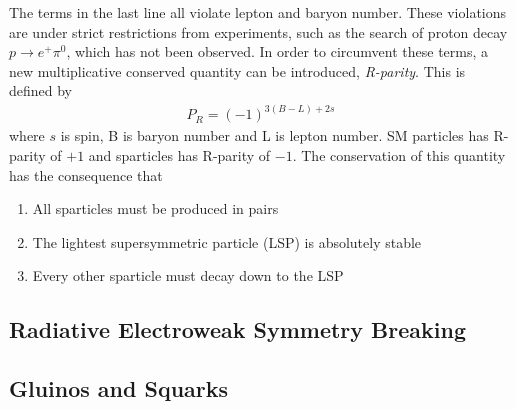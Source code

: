 The terms in the last line all violate lepton and baryon number. These violations are under strict restrictions from experiments, such as the search of proton decay $p\rightarrow e^{+}\pi^{0}$, which has not been observed. In order to circumvent these terms, a new multiplicative conserved quantity can be introduced, \emph{R-parity}. This is defined by
\begin{align}
    P_{R}=(-1)^{3(B-L)+2s}
\end{align}
where $s$ is spin, B is baryon number and L is lepton number. SM particles has R-parity of $+1$ and sparticles has R-parity of $-1$. The conservation of this quantity has the consequence that
\begin{enumerate}
    \item All sparticles must be produced in pairs
    \item The lightest supersymmetric particle (LSP) is absolutely stable
    \item Every other sparticle must decay down to the LSP
\end{enumerate}

\subsection{Radiative Electroweak Symmetry Breaking}

\subsection{Gluinos and Squarks}